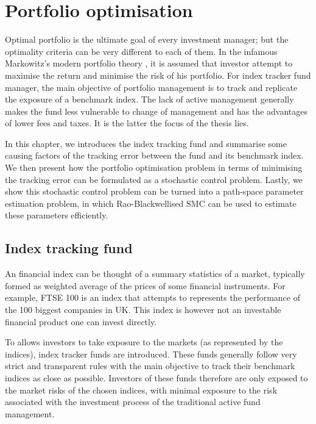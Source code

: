 \chapter{Portfolio optimisation}
\graphicspath{{Chapter4/figures/}}
\label{cha:po}
Optimal portfolio is the ultimate goal of every investment manager; but the optimality criteria can be very different to each of them. In the infamous Markowitz's modern portfolio theory \cite{HM52}, it is assumed that investor attempt to maximise the return and minimise the risk of his portfolio. For index tracker fund manager, the main objective of portfolio management is to track and replicate the exposure of a benchmark index. The lack of active management generally makes the fund less vulnerable to change of management and has the advantages of lower fees and taxes. It is the latter the focus of the thesis lies.
 
In this chapter, we introduces the index tracking fund and summarise some causing factors of the tracking error between the fund and its benchmark index. We then present how the portfolio optimisation problem in terms of minimising the tracking error can be formulated as a stochastic control problem. Lastly, we show this stochastic control problem can be turned into a path-space parameter estimation problem, in which Rao-Blackwellised SMC can be used to estimate these parameters efficiently.
 
\section{Index tracking fund}
An financial index can be thought of a summary statistics of a market, typically formed as weighted average of the prices of some financial instruments. For example, FTSE 100 is an index that attempts to represents the performance of the 100 biggest companies in UK. This index is however not an investable financial product one can invest directly.
 
To allows investors to take exposure to the markets (as represented by the indices), index tracker funds are introduced. These funds generally follow very strict and transparent rules with the main objective to track their benchmark indices as close as possible. Investors of these funds therefore are only exposed to the market risks of the chosen indices, with minimal exposure to the risk associated with the investment process of the traditional active fund management.
 
